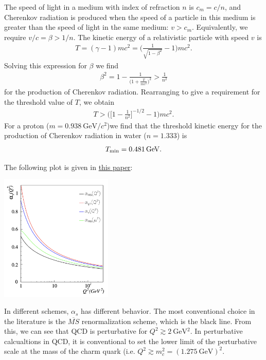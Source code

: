\def\duedate{12/18/22}
\def\HWnum{Final}

\usepackage[]{amssymb}


    

The speed of light in a medium with index of refraction $n$ is $c_{m} = c/n$, and Cherenkov radiation is produced when the speed of a particle in this medium is greater than the speed of light in the same medium: $v > c_{m}$.
Equivalently, we require $v/c = \beta > 1/n$.
The kinetic energy of a relativistic particle with speed $v$ is
\begin{eqnarray}
    T = (\gamma - 1)mc^2 = \Big( \frac{1}{\sqrt{1 - \beta^2}} - 1 \Big) mc^2
.\end{eqnarray}
Solving this expression for $\beta$ we find
\begin{eqnarray}
    \beta^2 = 1 - \frac{1}{\Big( 1 + \frac{T}{mc^2} \Big)^2} > \frac{1}{n^2}
\end{eqnarray}
for the production of Cherenkov radiation.
Rearranging to give a requirement for the threshold value of $T$, we obtain
\begin{eqnarray}
    T > \Big( \Big[ 1 - \frac{1}{n^2} \Big]^{-1/2} - 1 \Big) mc^2
.\end{eqnarray}
For a proton ($m = \SI{0.938}{\GeV/c^2}$)we find that the threshold kinetic energy for the production of Cherenkov radiation in water ($n = 1.333$) is
\begin{eqnarray}
    T_{\rm min} = \SI{0.481}{\GeV}
.\end{eqnarray}


The following plot is given in \href{https://arxiv.org/pdf/1604.08082.pdf}{this paper}:
\begin{center}
    \includegraphics[width=0.4\textwidth]{prob4.png}
\end{center}
In different schemes, $\alpha_{s}$ has different behavior.
The most conventional choice in the literature is the $\overline{MS}$ renormalization scheme, which is the black line.
From this, we can see that QCD is perturbative for $Q^2 \gtrsim \SI{2}{\GeV^2}$.
In perturbative calcualtions in QCD, it is conventional to set the lower limit of the perturbative scale at the mass of the charm quark (i.e. $Q^2 \gtrsim m_{c}^2 = (\SI{1.275}{\GeV})^2$.

